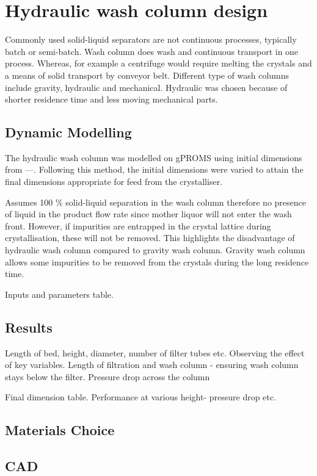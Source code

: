 \section{Hydraulic wash column design}

Commonly used solid-liquid separators are not continuous processes, typically batch or semi-batch. Wash column does wash and continuous transport in one process. Whereas, for example a centrifuge would require  melting the crystals and a means of solid transport by conveyor belt. Different type of wash columns include gravity, hydraulic and mechanical. Hydraulic was chosen because of shorter residence time and less moving mechanical parts. 

\subsection{Dynamic Modelling}
The hydraulic wash column was modelled on gPROMS using initial dimensions from ---. Following this method, the initial dimensions were varied to attain the final dimensions appropriate for feed from the crystalliser. 

Assumes 100 \% solid-liquid separation in the wash column therefore no presence of liquid in the product flow rate since mother liquor will not enter the wash front. However, if impurities are entrapped in the crystal lattice during crystallisation, these will not be removed. This highlights the disadvantage of hydraulic wash column compared to gravity wash column. Gravity wash column allows some impurities to be removed from the crystals during the long residence time. 

Inputs and parameters table. 

\subsection{Results}
Length of bed, height, diameter, number of filter tubes etc. Observing the effect of key variables. Length of filtration and wash column - ensuring wash column stays below the filter. Pressure drop across the column

Final dimension table. 
Performance at various height- pressure drop etc. 

\subsection{Materials Choice}

\subsection{CAD}

